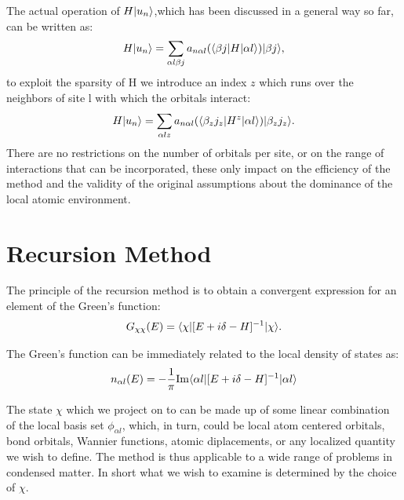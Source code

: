 The actual operation of $H|u_{n}\rangle$,which has been discussed in a general way so far, 
can be written as:
%
\begin{equation}
H|u_{n}\rangle = \sum_{\alpha l \beta j}a_{n \alpha l}(\langle \beta j |H| \alpha l\rangle)|\beta j\rangle,
\end{equation}
%
to exploit the sparsity of H we introduce an index $z$ which runs over the neighbors of 
site l with which the orbitals interact:
\begin{equation}
H|u_{n}\rangle = \sum_{\alpha l z}a_{n \alpha l}(\langle \beta_{z} j_{z} |H^{z}|\alpha l\rangle)|\beta_{z} j_{z}\rangle.
\end{equation}
There are no restrictions on the number of orbitals per site, or on the range of interactions that can be
incorporated, these only impact on the efficiency of the method and the validity of the original assumptions
about the dominance of the local atomic environment.


\section{Recursion Method}
The principle of the recursion method is to obtain a convergent expression 
for an element of the Green's function:
%
\begin{equation}
G_{\chi\chi}(E) = \langle\chi|[E + i\delta -H]^{-1}|\chi\rangle.
\end{equation}
%

The Green's function can be immediately related to the local density of states as:
%
\begin{equation}
n_{\alpha l}(E) = -\frac{1}{\pi} {\rm Im}\langle\alpha l|[E + i\delta -H]^{-1}|\alpha l\rangle
\end{equation}
%

The state $\chi$ which we project on to can be made up of some linear combination 
of the local basis set $\phi_{\alpha l}$, which, in turn, could be local atom centered orbitals, bond orbitals, 
Wannier functions, atomic diplacements, or any localized quantity we wish to define. The method is thus
applicable to a wide range of problems in condensed matter. In short what we wish to examine
is determined by the choice of $\chi$.

